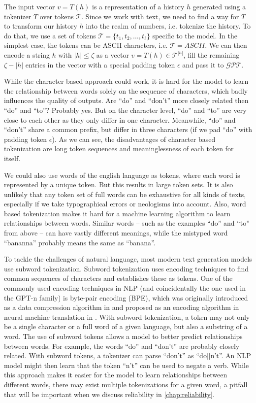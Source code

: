 The input vector $v=T(h)$ is a representation of a history $h$ generated using a tokenizer $T$ over tokens $\mathcal{T}$.
Since we work with text, we need to find a way for $T$ to transform our history $h$ into the realm of numbers, i.e. tokenize the history.
To do that, we use a set of tokens $\mathcal{T} = \{ t_1, t_2, \dots, t_\ell \}$ specific to the model.
In the simplest case, the tokens can be ASCII characters, i.e. $\mathcal{T} = ASCII$.
We can then encode a string $h$ with $|h| \leq \zeta$ as a vector $v = T(h) \in \mathcal{T}^{|h|}$, fill the remaining $\zeta - |h|$ entries in the vector with a special padding token $\epsilon$ and pass it to $\mathcal{GPT}$.
  
While the character based approach could work, it is hard for the model to learn the relationship between words solely on the sequence of characters, which badly influences the quality of outputs.
Are ``do'' and ``don't'' more closely related then ``do'' and ``to''?
Probably yes.
But on the character level, ``do'' and ``to'' are very close to each other as they only differ in one character.
Meanwhile, ``do'' and ``don't'' share a common prefix, but differ in three characters (if we pad ``do'' with padding token $\epsilon$).
As we can see, the disadvantages of character based tokenization are long token sequences and meaninglessness of each token for itself.

We could also use words of the english language as tokens, where each word is represented by a unique token.
But this results in large token sets.
It is also unlikely that any token set of full words can be exhaustive for all kinds of texts, especially if we take typographical errors or neologisms into account.
Also, word based tokenization makes it hard for a machine learning algorithm to learn relationships between words.
Similar words -- such as the examples ``do'' and ``to'' from above -- can have vastly different meanings, while the mistyped word ``bananna'' probably means the same as ``banana''.

To tackle the challenges of natural language, most modern text generation models use subword tokenization.
Subword tokenization uses encoding techniques to find common sequences of characters and establishes these as tokens.
One of the commonly used encoding techniques in NLP (and coincidentally the one used in the GPT-n family) is byte-pair encoding (BPE), which was originally introduced as a data compression algorithm in \cite{BPE1994} and proposed as an encoding algorithm in neural machine translation in \cite{BPENMT2016}.
With subword tokenization, a token may not only be a single character or a full word of a given language, but also a substring of a word.
The use of subword tokens allows a model to better predict relationships between words.
For example, the words ``do'' and ``don't'' are probably closely related.
With subword tokens, a tokenizer can parse ``don't'' as ``do$||$n't''. 
An NLP model might then learn that the token ``n't'' can be used to negate a verb.
While this approach makes it easier for the model to learn relationships between different words, there may exist multiple tokenizations for a given word, a pitfall that will be important when we discuss reliability in \autoref{chap:reliability}.

